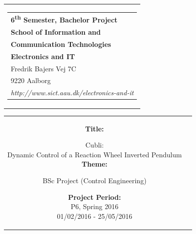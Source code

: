 % 
\thispagestyle{empty}
\begin{titlepage}
\begin{nopagebreak}
{\samepage 

\begin{tabular}{r}
\parbox{\textwidth}{  
\hfill \hspace{2cm} \parbox{8cm}{\begin{tabular}{l} %
{\small \textbf{\textcolor{aaublue}{\colorbox{white}{6\textsuperscript{th} Semester, Bachelor Project}}}}\\
{\small \textbf{\textcolor{aaublue}{School of Information and}}}\\
{\small \textbf{\textcolor{aaublue}{Communication Technologies}}}\\ 
{\small \textbf{\textcolor{aaublue}{Electronics and IT}}}\\
{\small \textcolor{aaublue}{Fredrik Bajers Vej 7C}} \\
{\small \textcolor{aaublue}{9220 Aalborg}} \\
{\small \textcolor{aaublue}{\emph{http://www.sict.aau.dk/electronics-and-it}}}
\end{tabular}}}
\end{tabular}

\begin{tabular}{cc}
\parbox{7cm}{

\textbf{Title:}

Cubli:\\
Dynamic Control of a Reaction Wheel Inverted Pendulum\\ %

\textbf{Theme:}

\small{
BSc Project (Control Engineering)\\
}


\parbox{8cm}{


\textbf{Project Period:}\\
P6, Spring 2016\\
01/02/2016 - 25/05/2016\\
   
}}
\end{tabular}}
\end{nopagebreak}
\end{titlepage}
